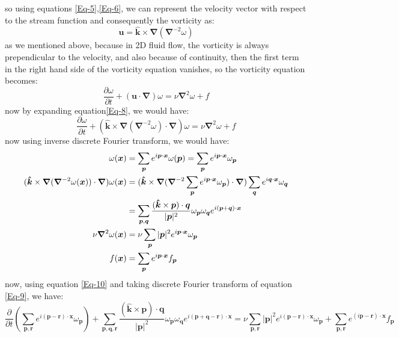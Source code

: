 \documentclass[10pt]{article}
\begin{document}
so using equations \eqref{Eq-5},\eqref{Eq-6}, we can represent the velocity vector with respect to the stream function and consequently the vorticity as:
%
\begin{equation}\label{Eq-7}
\bm{u}=\bm{\hat{k}}\times\bm{\nabla}({\bm{\nabla}}^{-2}\omega)
\end{equation}
%
as we mentioned above, because in 2D fluid flow, the vorticity is always prependicular to the velocity, and also because of continuity, then the first term in the right hand side of the vorticity equation vanishes, so the vorticity equation becomes:
%
\begin{equation}\label{Eq-8}
\frac{\partial{\omega}}{\partial t} + (\bm{u}\cdot\bm{\nabla})\omega= \nu\bm{\nabla}^2\omega + f
\end{equation}
%
now by expanding equation\eqref{Eq-8}, we would have:
%
\begin{equation}\label{Eq-9}
\frac{\partial{\omega}}{\partial t} + (\bm{\hat{k}}\times\bm{\nabla}({\bm{\nabla}}^{-2}\omega)\cdot\bm{\nabla})\omega= \nu\bm{\nabla}^2\omega + f
\end{equation}
now using inverse discrete Fourier transform, we would have:
%
\begin{align}
\omega(\bm{x})&=\sum_{\bm{p}}{e^{i\bm{p}\cdot\bm{x}}\omega(\bm{p})}=\sum_{\bm{p}}{e^{i\bm{p}\cdot\bm{x}}\omega_{\bm{p}}} \notag  \\
(\bm{\hat{k}}\times\bm{\nabla}({\bm{\nabla}}^{-2}\omega(\bm{x}))\cdot\bm{\nabla})\omega(\bm{x}) &=(\bm{\hat{k}}\times\bm{\nabla}({\bm{\nabla}}^{-2}\sum_{\bm{p}}{e^{i\bm{p}\cdot\bm{x}}\omega_{\bm{p}}})\cdot\bm{\nabla})\sum_{\bm{q}}{e^{i\bm{q}\cdot\bm{x}}\omega_{\bm{q}}} \notag \\
&=\sum_{\bm{p},\bm{q}}{\frac{(\bm{\hat{k}}\times\bm{p})\cdot\bm{q}}{|\bm{p}|^2}\omega_{\bm{p}}\omega_{\bm{q}}e^{i(\bm{p}+\bm{q})\cdot\bm{x}}} \notag \\
\nu\bm{\nabla}^2\omega(\bm{x})&=\nu\sum_{\bm{p}}{|\bm{p}|^2e^{i\bm{p}\cdot\bm{x}}\omega_{\bm{p}}}  \notag \\
f(\bm{x})&=\sum_{\bm{p}}{e^{i\bm{p}\cdot\bm{x}}f_{\bm{p}}} \label{Eq-10}
\end{align}
%
now, using equation \eqref{Eq-10} and taking discrete Fourier transform of equation \eqref{Eq-9}, we have:
%
\begin{equation}\label{Eq-11}
\frac{\partial}{\partial t}({\sum_{\bm{p},\bm{r}}{e^{i(\bm{p}-\bm{r})\cdot\bm{x}}\omega_{\bm{p}}}}) + \sum_{\bm{p},\bm{q},\bm{r}}{\frac{(\bm{\hat{k}}\times\bm{p})\cdot\bm{q}}{|\bm{p}|^2}\omega_{\bm{p}}\omega_{\bm{q}}e^{i(\bm{p}+\bm{q}-\bm{r})\cdot\bm{x}}}= \nu\sum_{\bm{p},\bm{r}}{|\bm{p}|^2e^{i(\bm{p}-\bm{r})\cdot\bm{x}}\omega_{\bm{p}}} + \sum_{\bm{p},\bm{r}}{e^{(i\bm{p}-\bm{r})\cdot\bm{x}}f_{\bm{p}}}
\end{equation}
\end{document}
